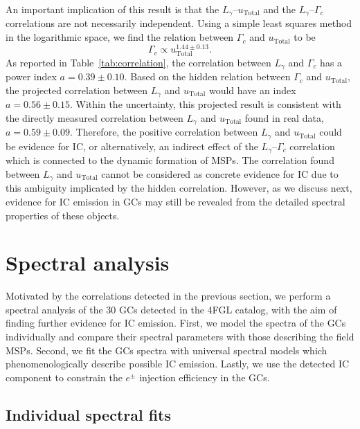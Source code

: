\documentclass[doublespace,nopageskip]{VTthesis} %
\begin{document}
An important implication of this result is that the $L_\gamma$--$u_\mathrm{Total}$ and the $L_\gamma$--$\Gamma_c$ correlations are not necessarily independent. Using a simple least squares method in the logarithmic space, we find the relation between $\Gamma_c$ and $u_\mathrm{Total}$ to be
\begin{equation}
    \Gamma_c \propto u_\mathrm{Total}^{1.44 \pm 0.13}.
\end{equation}
As reported in Table~\ref{tab:correlation}, the correlation between $L_\gamma$ and $\Gamma_c$ has a power index $a=0.39 \pm 0.10$. Based on the hidden relation between $\Gamma_c$ and $u_\mathrm{Total}$, the projected correlation between $L_\gamma$ and $u_\mathrm{Total}$ would have an index $a = 0.56 \pm 0.15$. Within the uncertainty, this projected result is consistent with the directly measured correlation between $L_\gamma$ and $u_\mathrm{Total}$ found in real data, $a = 0.59 \pm 0.09$. Therefore, the positive correlation between $L_\gamma$ and $u_\mathrm{Total}$ could be evidence for IC, or alternatively, an indirect effect of the $L_\gamma$--$\Gamma_c$ correlation which is connected to the dynamic formation of MSPs. The correlation found between $L_\gamma$ and $u_\mathrm{Total}$ cannot be considered as concrete evidence for IC due to this ambiguity implicated by the hidden correlation. However, as we discuss next, evidence for IC emission in GCs may still be revealed from the detailed spectral properties of these objects.

\section{Spectral analysis}\label{sec:spectra}

Motivated by the correlations detected in the previous section, we perform a spectral analysis of the 30 GCs detected in the 4FGL catalog, with the aim of finding further evidence for IC emission. First, we model the spectra of the GCs individually and compare their spectral parameters with those describing the field MSPs. Second, we fit the GCs spectra with universal spectral models which phenomenologically describe possible IC emission. Lastly, we use the detected IC component to constrain the $e^\pm$ injection efficiency in the GCs.

\subsection{Individual spectral fits}\label{sec:spectra_individual}
\end{document}
